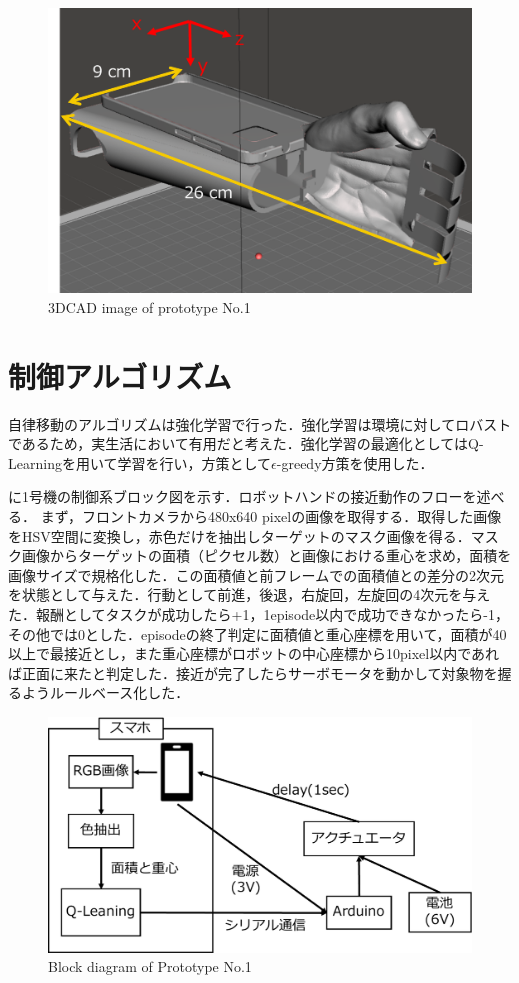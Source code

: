 \begin{figure}[H]
    \centering
    \includegraphics[width=\linewidth]{figure/chapter3/1号機CAD}
    \caption{3DCAD image of prototype No.1}
    \label{fig:1号機CAD}
\end{figure}


\section{制御アルゴリズム}
自律移動のアルゴリズムは強化学習で行った．強化学習は環境に対してロバストであるため，実生活において有用だと考えた．強化学習の最適化としてはQ-Learningを用いて学習を行い，方策として$\epsilon$-greedy方策を使用した．

に1号機の制御系ブロック図を示す．ロボットハンドの接近動作のフローを述べる．
まず，フロントカメラから480x640 pixelの画像を取得する．取得した画像をHSV空間に変換し，赤色だけを抽出しターゲットのマスク画像を得る．マスク画像からターゲットの面積（ピクセル数）と画像における重心を求め，面積を画像サイズで規格化した．この面積値と前フレームでの面積値との差分の2次元を状態として与えた．行動として前進，後退，右旋回，左旋回の4次元を与えた．報酬としてタスクが成功したら+1，1episode以内で成功できなかったら-1，その他では0とした．episodeの終了判定に面積値と重心座標を用いて，面積が40以上で最接近とし，また重心座標がロボットの中心座標から10pixel以内であれば正面に来たと判定した．接近が完了したらサーボモータを動かして対象物を握るようルールベース化した．

\begin{figure}[H]
    \centering
    \includegraphics[width=0.7\linewidth]{figure/chapter3/1号機制御図}
    \caption{Block diagram of Prototype No.1}
    \label{fig:1号機制御図}
\end{figure}


